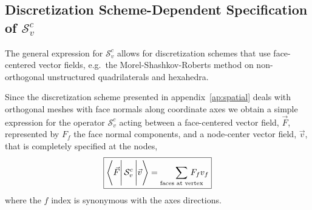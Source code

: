 \documentclass{article}
\newcommand{\bracket}[3]{%
  \ensuremath{%
       \left\langle {#1} \rule{0mm}{4ex} \right|%
       {#2} \left| {#3}  \rule{0mm}{4ex} \right\rangle%
  }%
}
\begin{document}
\subsection{Discretization Scheme-Dependent
            Specification of $\mathcal{S}^{c}_{v}$}

The general expression for $\mathcal{S}^{c}_{v}$ allows for discretization
schemes that use face-centered vector fields, e.g.\ the Morel-Shashkov-Roberts
method\cite{MorelShashkov}
 on non-orthogonal unstructured quadrilaterals and hexahedra.

Since the discretization scheme presented in appendix~\ref{ap:spatial} deals
with orthogonal meshes with face normals along coordinate axes we obtain
a simple expression for the operator $\mathcal{S}^{c}_{v}$ acting between
a face-centered vector field, $\vec{F}$, represented by $F_{f}$ the face normal
components, and a node-center vector field, $\vec{v}$, that is completely
specified at the nodes,
\begin{equation}
 \boxed{
   \bracket{\vec{F}}{\mathcal{S}^{c}_{v}}{\vec{v}} =
       \sum_{\text{faces at vertex}} \!\!\!\!\!\!\!\!\!\! F_{f} v_{f}
 }
\end{equation}
where the $f$ index is synonymous with the axes directions.



\end{document}
